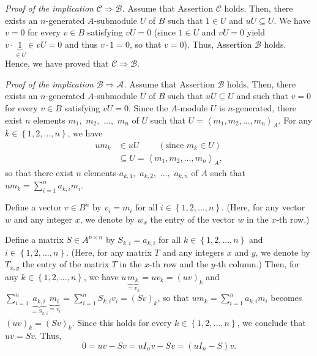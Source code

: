 \documentclass[12pt,final,notitlepage,onecolumn]{article}%
\begin{document}
\textit{Proof of the implication }$\mathcal{C}\Longrightarrow\mathcal{B}%
$\textit{.} Assume that Assertion $\mathcal{C}$ holds. Then, there exists an
$n$-generated $A$-submodule $U$ of $B$ such that $1\in U$ and $uU\subseteq U$.
We have $v=0$ for every $v\in B$ satisfying $vU=0$ (since $1\in U$ and $vU=0$
yield $v\cdot\underbrace{1}_{\in U}\in vU=0$ and thus $v\cdot1=0$, so that
$v=0$). Thus, Assertion $\mathcal{B}$ holds. Hence, we have proved that
$\mathcal{C}\Longrightarrow\mathcal{B}$.

\textit{Proof of the implication }$\mathcal{B}\Longrightarrow\mathcal{A}%
$\textit{.} Assume that Assertion $\mathcal{B}$ holds. Then, there exists an
$n$-generated $A$-submodule $U$ of $B$ such that $uU\subseteq U$ and such that
$v=0$ for every $v\in B$ satisfying $vU=0$. Since the $A$-module $U$ is
$n$-generated, there exist $n$ elements $m_{1},$ $m_{2},$ $...,$ $m_{n}$ of
$U$ such that $U=\left\langle m_{1},m_{2},...,m_{n}\right\rangle _{A}$. For
any $k\in\left\{  1,2,...,n\right\}  $, we have%
\begin{align*}
um_{k}  &  \in uU\ \ \ \ \ \ \ \ \ \ \left(  \text{since }m_{k}\in U\right) \\
&  \subseteq U=\left\langle m_{1},m_{2},...,m_{n}\right\rangle _{A},
\end{align*}
so that there exist $n$ elements $a_{k,1},$ $a_{k,2},$ $...,$ $a_{k,n}$ of $A$
such that $um_{k}=\sum\limits_{i=1}^{n}a_{k,i}m_{i}$.

Define a vector $v\in B^{n}$ by $v_{i}=m_{i}$ for all $i\in\left\{
1,2,...,n\right\}  $. (Here, for any vector $w$ and any integer $x$, we denote
by $w_{x}$ the entry of the vector $w$ in the $x$-th row.)

Define a matrix $S\in A^{n\times n}$ by $S_{k,i}=a_{k,i}$ for all
$k\in\left\{  1,2,...,n\right\}  $ and $i\in\left\{  1,2,...,n\right\}  $.
(Here, for any matrix $T$ and any integers $x$ and $y$, we denote by $T_{x,y}$
the entry of the matrix $T$ in the $x$-th row and the $y$-th column.) Then,
for any $k\in\left\{  1,2,...,n\right\}  $, we have $u\underbrace{m_{k}%
}_{=v_{k}}=uv_{k}=\left(  uv\right)  _{k}$ and $\sum\limits_{i=1}%
^{n}\underbrace{a_{k,i}}_{=S_{k,i}}\underbrace{m_{i}}_{=v_{i}}=\sum
\limits_{i=1}^{n}S_{k,i}v_{i}=\left(  Sv\right)  _{k}$, so that $um_{k}%
=\sum\limits_{i=1}^{n}a_{k,i}m_{i}$ becomes $\left(  uv\right)  _{k}=\left(
Sv\right)  _{k}$. Since this holds for every $k\in\left\{  1,2,...,n\right\}
$, we conclude that $uv=Sv$. Thus,%
\[
0=uv-Sv=uI_{n}v-Sv=\left(  uI_{n}-S\right)  v.
\]
\end{document}
